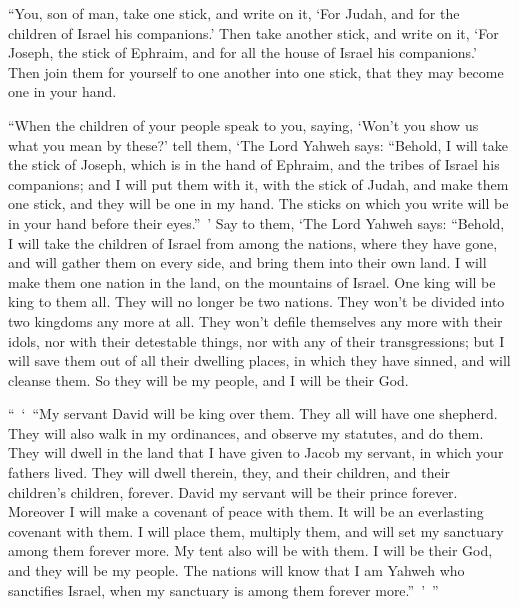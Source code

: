 {“You, son of man, take one stick, and write on it, ‘For Judah, and for the children of Israel his companions.’ Then take another stick, and write on it, ‘For Joseph, the stick of Ephraim, and for all the house of Israel his companions.’
Then join them for yourself to one another into one stick, that they may become one in your hand.
\par }{\PP {}“When the children of your people speak to you, saying, ‘Won’t you show us what you mean by these?’
tell them, ‘The Lord Yahweh says: “Behold, I will take the stick of Joseph, which is in the hand of Ephraim, and the tribes of Israel his companions; and I will put them with it, with the stick of Judah, and make them one stick, and they will be one in my hand.
The sticks on which you write will be in your hand before their eyes.” ’
Say to them, ‘The Lord Yahweh says: “Behold, I will take the children of Israel from among the nations, where they have gone, and will gather them on every side, and bring them into their own land.
I will make them one nation in the land, on the mountains of Israel. One king will be king to them all. They will no longer be two nations. They won’t be divided into two kingdoms any more at all.
They won’t defile themselves any more with their idols, nor with their detestable things, nor with any of their transgressions; but I will save them out of all their dwelling places, in which they have sinned, and will cleanse them. So they will be my people, and I will be their God.
\par }{\PP {}“ ‘ “My servant David will be king over them. They all will have one shepherd. They will also walk in my ordinances, and observe my statutes, and do them.
They will dwell in the land that I have given to Jacob my servant, in which your fathers lived. They will dwell therein, they, and their children, and their children’s children, forever. David my servant will be their prince forever.
Moreover I will make a covenant of peace with them. It will be an everlasting covenant with them. I will place them, multiply them, and will set my sanctuary among them forever more.
My tent also will be with them. I will be their God, and they will be my people.
The nations will know that I am Yahweh who sanctifies Israel, when my sanctuary is among them forever more.” ’ ”

}
